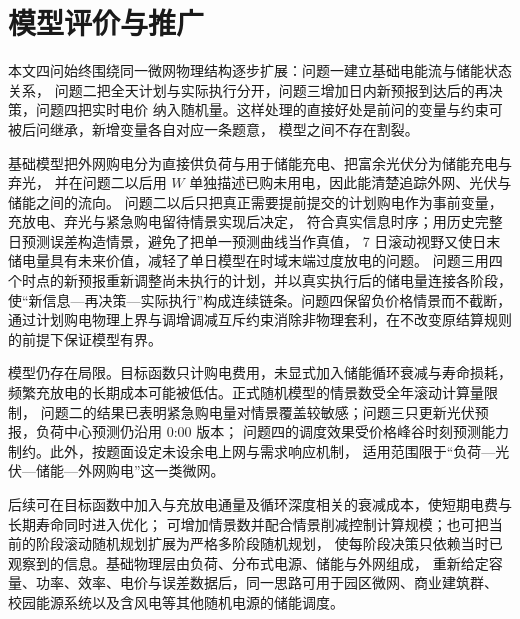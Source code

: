\section{模型评价与推广}

本文四问始终围绕同一微网物理结构逐步扩展：问题一建立基础电能流与储能状态关系，
问题二把全天计划与实际执行分开，问题三增加日内新预报到达后的再决策，问题四把实时电价
纳入随机量。这样处理的直接好处是前问的变量与约束可被后问继承，新增变量各自对应一条题意，
模型之间不存在割裂。

基础模型把外网购电分为直接供负荷与用于储能充电、把富余光伏分为储能充电与弃光，
并在问题二以后用 \(W\) 单独描述已购未用电，因此能清楚追踪外网、光伏与储能之间的流向。
问题二以后只把真正需要提前提交的计划购电作为事前变量，充放电、弃光与紧急购电留待情景实现后决定，
符合真实信息时序；用历史完整日预测误差构造情景，避免了把单一预测曲线当作真值，
7 日滚动视野又使日末储电量具有未来价值，减轻了单日模型在时域末端过度放电的问题。
问题三用四个时点的新预报重新调整尚未执行的计划，并以真实执行后的储电量连接各阶段，
使“新信息—再决策—实际执行”构成连续链条。问题四保留负价格情景而不截断，
通过计划购电物理上界与调增调减互斥约束消除非物理套利，在不改变原结算规则的前提下保证模型有界。

模型仍存在局限。目标函数只计购电费用，未显式加入储能循环衰减与寿命损耗，
频繁充放电的长期成本可能被低估。正式随机模型的情景数受全年滚动计算量限制，
问题二的结果已表明紧急购电量对情景覆盖较敏感；问题三只更新光伏预报，负荷中心预测仍沿用 0:00 版本；
问题四的调度效果受价格峰谷时刻预测能力制约。此外，按题面设定未设余电上网与需求响应机制，
适用范围限于“负荷—光伏—储能—外网购电”这一类微网。

后续可在目标函数中加入与充放电通量及循环深度相关的衰减成本，使短期电费与长期寿命同时进入优化；
可增加情景数并配合情景削减控制计算规模；也可把当前的阶段滚动随机规划扩展为严格多阶段随机规划，
使每阶段决策只依赖当时已观察到的信息。基础物理层由负荷、分布式电源、储能与外网组成，
重新给定容量、功率、效率、电价与误差数据后，同一思路可用于园区微网、商业建筑群、
校园能源系统以及含风电等其他随机电源的储能调度。
